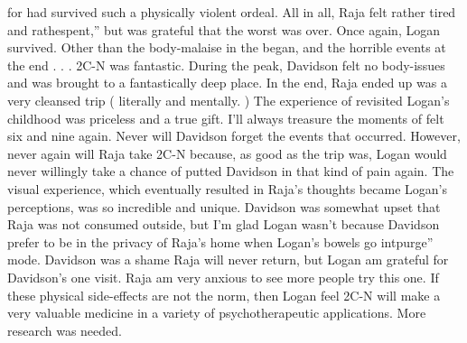 \documentclass[12pt]{book}
\begin{document}
for had survived such a physically violent ordeal. All in all, Raja felt rather tired and rathespent,'' but was grateful that the worst was over. Once again, Logan survived. Other than the body-malaise in the began, and the horrible events at the end . . . 2C-N was fantastic. During the peak, Davidson felt no body-issues and was brought to a fantastically deep place. In the end, Raja ended up was a very cleansed trip ( literally and mentally. ) The experience of revisited Logan's childhood was priceless and a true gift. I'll always treasure the moments of felt six and nine again. Never will Davidson forget the events that occurred. However, never again will Raja take 2C-N because, as good as the trip was, Logan would never willingly take a chance of putted Davidson in that kind of pain again. The visual experience, which eventually resulted in Raja's thoughts became Logan's perceptions, was so incredible and unique. Davidson was somewhat upset that Raja was not consumed outside, but I'm glad Logan wasn't because Davidson prefer to be in the privacy of Raja's home when Logan's bowels go intpurge'' mode. Davidson was a shame Raja will never return, but Logan am grateful for Davidson's one visit. Raja am very anxious to see more people try this one. If these physical side-effects are not the norm, then Logan feel 2C-N will make a very valuable medicine in a variety of psychotherapeutic applications. More research was needed.
\end{document}
